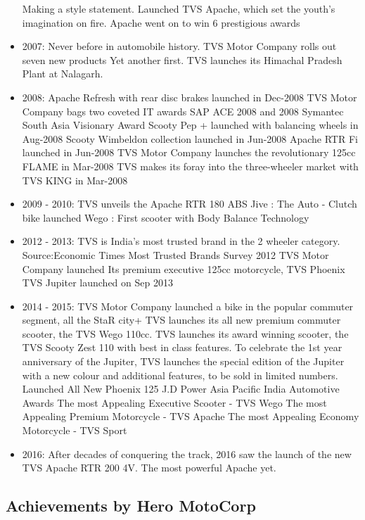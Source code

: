 \begin{itemize}
	Making a style statement. Launched TVS Apache, which set the youth's imagination on fire. Apache went on to win 6 prestigious awards
	\item 2007:
	Never before in automobile history. TVS Motor Company rolls out seven new products
	Yet another first. TVS launches its Himachal Pradesh Plant at Nalagarh.
	\item 2008:
	Apache Refresh with rear disc brakes launched in Dec-2008
	TVS Motor Company bags two coveted IT awards SAP ACE 2008 and 2008 Symantec South Asia Visionary Award
	Scooty Pep + launched with balancing wheels in Aug-2008
	Scooty Wimbeldon collection launched in Jun-2008
	Apache RTR Fi launched in Jun-2008
	TVS Motor Company launches the revolutionary 125cc FLAME in Mar-2008
	TVS makes its foray into the three-wheeler market with TVS KING in Mar-2008
	\item 2009 - 2010:
	TVS unveils the Apache RTR 180 ABS
	Jive : The Auto - Clutch bike launched
	Wego : First scooter with Body Balance Technology
	\item 2012 - 2013:
	TVS is India's most trusted brand in the 2 wheeler category.
	Source:Economic Times Most Trusted Brands Survey 2012
	TVS Motor Company launched Its premium executive 125cc motorcycle, TVS Phoenix
	TVS Jupiter launched on Sep 2013
	
	\item 2014 - 2015:
	TVS Motor Company launched a bike in the popular commuter segment, all the StaR city+
	TVS launches its all new premium commuter scooter, the TVS Wego 110cc.
	TVS launches its award winning scooter, the TVS Scooty Zest 110 with best in class features.
	To celebrate the 1st year anniversary of the Jupiter, TVS launches the special edition of the Jupiter with a new colour and additional features, to be sold in limited numbers.
	Launched All New Phoenix 125
	J.D Power Asia Pacific India Automotive Awards
	The most Appealing Executive Scooter - TVS Wego
	The most Appealing Premium Motorcycle - TVS Apache
	The most Appealing Economy Motorcycle - TVS Sport
	
	\item 2016:
	After decades of conquering the track, 2016 saw the launch of the new TVS Apache RTR 200 4V. The most powerful Apache yet.
\end{itemize}	

\subsection{Achievements by Hero MotoCorp}

